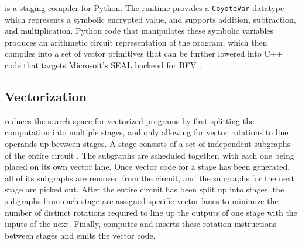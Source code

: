 \system is a staging compiler for Python.
The runtime provides a \texttt{CoyoteVar} datatype which represents a symbolic encrypted value, and supports addition, subtraction, and multiplication.
Python code that manipulates these symbolic variables produces an arithmetic circuit representation of the program, which \system then compiles into a set of vector primitives that can be further lowered into C++ code that targets Microsoft's SEAL backend for BFV .
 
\subsection{Vectorization}
\system reduces the search space for vectorized programs  by first splitting the computation into multiple stages, and only allowing for vector rotations to line operands up between stages.
A stage consists of a set of independent subgraphs of the entire circuit . 
The subgraphs are scheduled together, with each one being placed on its own vector lane. 
Once vector code for a stage has been generated, all of its subgraphs are removed from the circuit, and the subgraphs for the next stage are picked out.
After the entire circuit has been split up into stages, the subgraphs from each stage are assigned specific vector lanes to minimize the number of distinct rotations required to line up the outputs of one stage with the inputs of the next.
Finally, \system computes and inserts these rotation instructions between stages and emits the vector code.